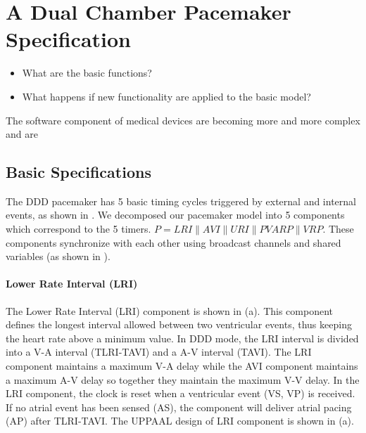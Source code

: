 \chapter{A Dual Chamber Pacemaker Specification}

\begin{itemize}
	\item What are the basic functions?
   \item What happens if new functionality are applied to the basic model?
\end{itemize}
The software component of medical devices are becoming more and more complex and are
\section{Basic Specifications}
The DDD pacemaker has 5 basic timing cycles triggered by external and internal events, as shown in . We decomposed our pacemaker model into 5 components which correspond to the 5 timers. $P=LRI\| AVI\| URI\| PVARP\| VRP$. These components synchronize with each other using broadcast channels and shared variables (as shown in ). 

\subsubsection{Lower Rate Interval (LRI)}
The Lower Rate Interval (LRI) component is shown in (a). This component defines the longest interval allowed between two ventricular events, thus keeping the heart rate above a minimum value. In DDD mode, the LRI interval is divided into a V-A interval (TLRI-TAVI) and a A-V interval (TAVI). The LRI component maintains a maximum V-A delay while the AVI component maintains a maximum A-V delay so together they maintain the maximum V-V delay. In the LRI component, the clock is reset when a ventricular event \textsf{(VS, VP)} is received. If no atrial event has been sensed \textsf{(AS)}, the component will deliver atrial pacing \textsf{(AP)} after TLRI-TAVI. The UPPAAL design of LRI component is shown in (a).

